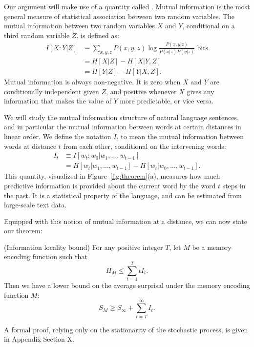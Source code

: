 Our argument will make use of a quantity called . Mutual information is the most general measure of statistical association between two random variables. The mutual information between two random variables $X$ and $Y$, conditional on a third random variable $Z$, is defined as:
\begin{align}
\label{eq:mi}
    I[X:Y|Z] &\equiv \sum_{x,y,z} P(x,y,z) \log \frac{P(x,y|z)}{P(x|z)P(y|z)} \text{ bits} \\
    &= H[X|Z] - H[X|Y,Z] \\
    &= H[Y|Z] - H[Y|X,Z].
\end{align}
Mutual information is always non-negative. It is zero when $X$ and $Y$ are conditionally independent given $Z$, and positive whenever $X$ gives any information that makes the value of $Y$ more predictable, or vice versa. 

We will study the mutual information structure of natural language sentences, and in particular the mutual information between words at certain distances in linear order. We define the notation $I_t$ to mean the mutual information between words at distance $t$ from each other, conditional on the intervening words:
\begin{align}
    I_t &\equiv I[w_t : w_0 | w_1, \dots, w_{t-1}] \\
    &= H[w_t | w_1, \dots, w_{t-1}] - H[w_t | w_0, \dots, w_{t-1}].
\end{align}
This quantity, visualized in Figure~\ref{fig:theorem}(a), measures how much predictive information is provided about the current word by the word $t$ steps in the past.
It is a statistical property of the language, and can be estimated from large-scale text data.

Equipped with this notion of mutual information at a distance, we can now state our theorem:
\begin{thm}\label{prop:suboptimal}(Information locality bound) For any positive integer $T$, let $M$ be a memory encoding function such that
\begin{equation}
\label{eq:memory-bound}
H_M \le \sum_{t=1}^T t I_t.    
\end{equation}
Then we have a lower bound on the average surprisal under the memory encoding function $M$:
\begin{equation}
\label{eq:surprisal-bound}
S_M \ge S_\infty + \sum_{t=T}^\infty I_t.
\end{equation}
\end{thm}
A formal proof, relying only on the stationarity of the stochastic process, is given in Appendix Section X. 

